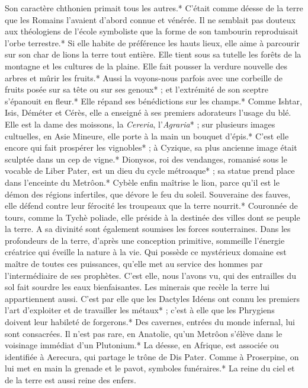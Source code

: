 \documentclass[a4paper, 11pt, oneside, polutonikogreek, french]{article}
\begin{document}
Son caractère chthonien primait tous les autres.* C'était comme déesse de la terre que les Romains l'avaient d'abord connue et vénérée. Il ne semblait pas douteux aux théologiens de l'école symboliste que la forme de son tambourin reproduisait l'orbe terrestre.* Si elle habite de préférence les hauts lieux, elle aime à parcourir sur son char de lions la terre tout entière. Elle tient sous sa tutelle les forêts de la montagne et les cultures de la plaine. Elle fait pousser la verdure nouvelle des arbres et mûrir les fruits.* Aussi la voyons-nous parfois avec une corbeille de fruits posée sur sa tête ou sur ses genoux* ; et l'extrémité de son sceptre s'épanouit en fleur.* Elle répand ses bénédictions sur les champs.* Comme Ishtar, Isis, Déméter et Cérès, elle a enseigné à ses premiers adorateurs l'usage du blé. Elle est la dame des moissons, la \emph{Cereria}, l'\emph{Agraria}* ; sur plusieurs images cultuelles, en Asie Mineure, elle porte à la main un bouquet d'épis.* C'est elle encore qui fait prospérer les vignobles* ; à Cyzique, sa plus ancienne image était sculptée dans un cep de vigne.* Dionysos, roi des vendanges, romanisé sous le vocable de Liber Pater, est un dieu du cycle métroaque* ; sa statue prend place dans l'enceinte du Metrôon.* Cybèle enfin maîtrise le lion, parce qu'il est le démon des régions infertiles, que dévore le feu du soleil. Souveraine des fauves, elle défend contre leur férocité les troupeaux que la terre nourrit.* Couronnée de tours, comme la Tychè poliade, elle préside à la destinée des villes dont se peuple la terre. A sa divinité sont également soumises les forces souterraines. Dans les profondeurs de la terre, d'après une conception primitive, sommeille l'énergie créatrice qui éveille la nature à la vie. Qui possède ce mystérieux domaine est maître de toutes ces puissances, qu'elle met au service des hommes par l'intermédiaire de ses prophètes. C'est elle, nous l'avons vu, qui des entrailles du sol fait sourdre les eaux bienfaisantes. Les minerais que recèle la terre lui appartiennent aussi. C'est par elle que les Dactyles Idéens ont connu les premiers l'art d'exploiter et de travailler les métaux* ; c'est à elle que les Phrygiens doivent leur habileté de forgerons.* Des cavernes, entrées du monde infernal, lui sont consacrées. Il n'est pas rare, en Anatolie, qu'un Metrôon s'élève dans le voisinage immédiat d'un Plutonium.* La déesse, en Afrique, est associée ou identifiée à Aerecura, qui partage le trône de Dis Pater. Comme à Proserpine, on lui met en main la grenade et le pavot, symboles funéraires.* La reine du ciel et de la terre est aussi reine des enfers.
\end{document}
